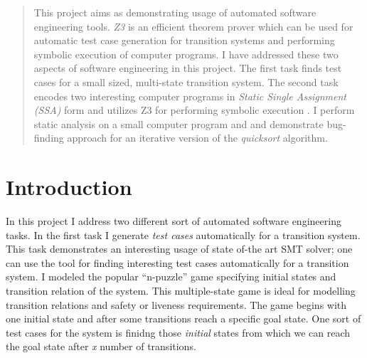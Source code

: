 \documentclass{sig-alternate-05-2015}
\begin{document}
\author{
%
%
\alignauthor
Shafiul Azam Chowdhury\\
       \\
       \\
}


\maketitle
\begin{abstract}
This project aims as demonstrating usage of automated software engineering tools. \textit{Z3} is an efficient theorem prover which can be used for automatic test case generation for transition systems and performing symbolic execution of computer programs. I have addressed these two aspects of software engineering in this project. The first task finds test cases for a small sized, multi-state transition system. The second task encodes two interesting computer programs in \textit{Static Single Assignment (SSA)} \cite{Alpern:SSA} form and utilizes Z3 for performing symbolic execution \cite{King:SE}. I perform static analysis on a small computer program and and demonstrate bug-finding approach for an iterative version of the \textit{quicksort} algorithm. 
\end{abstract}



\section{Introduction}
In this project I address two different sort of automated software engineering tasks. In the first task I generate \textit{test cases} automatically for a transition system. This task demonstrates an interesting usage of state of-the art SMT solver; one can use the tool for finding interesting test cases automatically for a transition system. I modeled the popular ``n-puzzle'' game specifying initial states and transition relation of the system. This multiple-state game is ideal for modelling transition relations and safety or liveness requirements. The game begins with one initial state and after some transitions reach a specific goal state. One sort of test cases for the system is finidng those \textit{initial} states from which we can reach the goal state after \textit{x} number of transitions.
\end{document}
